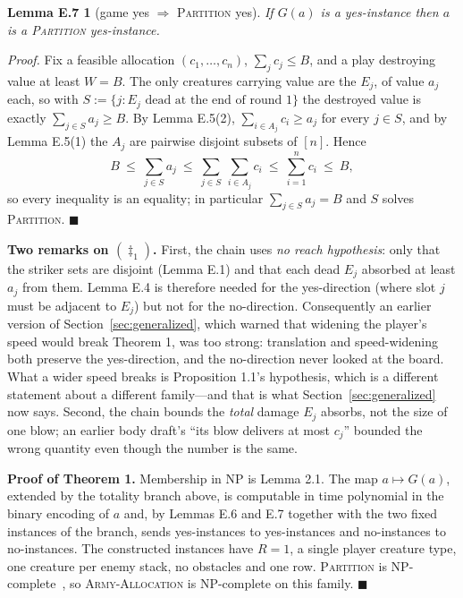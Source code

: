 \documentclass[11pt,a4paper]{article}
\theoremstyle{plain}
\newtheorem*{lemEnoone}{Lemma E.7}
\theoremstyle{definition}
\theoremstyle{plain}
\theoremstyle{definition}
\theoremstyle{remark}
\newcommand{\ALLOC}{\textsc{Army-Allocation}}
\newcommand{\PARTITION}{\textsc{Partition}}
\newcommand{\qedbox}{\hfill$\blacksquare$}
\begin{document}
\begin{lemEnoone}[game yes $\Longrightarrow$ \PARTITION{} yes]
If $G(a)$ is a yes-instance then $a$ is a \PARTITION{} yes-instance.
\end{lemEnoone}

\noindent\emph{Proof.} Fix a feasible allocation $(c_1,\dots,c_n)$, $\sum_j c_j\le B$, and a
play destroying value at least $W=B$. The only creatures carrying value are the $E_j$, of
value $a_j$ each, so with $S:=\{j: E_j \text{ dead at the end of round 1}\}$ the destroyed
value is exactly $\sum_{j\in S}a_j\ge B$. By Lemma E.5(2), $\sum_{i\in A_j}c_i\ge a_j$ for
every $j\in S$, and by Lemma E.5(1) the $A_j$ are pairwise disjoint subsets of $[n]$. Hence
\begin{equation*}
  B\ \le\ \sum_{j\in S}a_j\ \le\ \sum_{j\in S}\ \sum_{i\in A_j}c_i\ \le\ \sum_{i=1}^{n}c_i
  \ \le\ B ,
  \tag{$\ddagger_1$}
\end{equation*}
so every inequality is an equality; in particular $\sum_{j\in S}a_j=B$ and $S$ solves
\PARTITION. \qedbox

\smallskip
\noindent\textbf{Two remarks on $(\ddagger_1)$.} First, the chain uses \emph{no reach
hypothesis}: only that the striker sets are disjoint (Lemma E.1) and that each dead $E_j$
absorbed at least $a_j$ from them. Lemma E.4 is therefore needed for the yes-direction
(where slot $j$ must be adjacent to $E_j$) but not for the no-direction. Consequently an
earlier version of Section~\ref{sec:generalized}, which warned that widening the player's
speed would break Theorem 1, was too strong: translation and speed-widening both preserve the
yes-direction, and the no-direction never looked at the board. What a wider speed breaks is
Proposition 1.1's hypothesis, which is a different statement about a different family---and
that is what Section~\ref{sec:generalized} now says.
Second, the chain bounds the \emph{total} damage $E_j$ absorbs, not the size of one blow;
an earlier body draft's ``its blow delivers at most $c_j$'' bounded the wrong quantity even though the
number is the same.

\smallskip
\noindent\textbf{Proof of Theorem 1.} Membership in NP is Lemma 2.1. The map
$a\mapsto G(a)$, extended by the totality branch above, is computable in time polynomial in
the binary encoding of $a$ and, by Lemmas E.6 and E.7 together with the two fixed instances
of the branch, sends yes-instances to yes-instances and no-instances to no-instances. The
constructed instances have $R=1$, a single player creature type, one creature per enemy
stack, no obstacles and one row. \PARTITION{} is NP-complete~\cite{Kar72}, so \ALLOC{} is
NP-complete on this family. \qedbox
\end{document}
